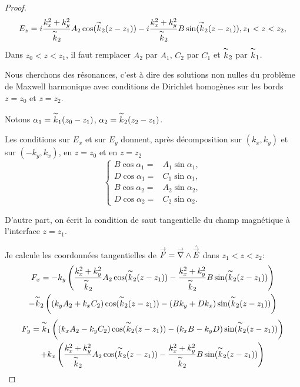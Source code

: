 \begin{proof}
    \[
    E_z=i\dfrac{k_x^2+k_y^2}{\overset{\thicksim}{k}_2}A_2\cos(\overset{\thicksim}{k}_2(z-z_1))-i\dfrac{k_x^2+k_y^2}{\overset{\thicksim}{k}_2}B\sin(\overset{\thicksim}{k}_2(z-z_1)), z_1<z<z_2,
    \]
    Dans \(z_0<z<z_1\), il faut remplacer \(A_2\) par \(A_1\), \(C_2\) par \(C_1\) et \(\overset{\thicksim}{k}_2\) par \(\overset{\thicksim}{k}_1\).

    Nous cherchons des résonances, c'est à dire des solutions non nulles du problème de Maxwell harmonique avec conditions de Dirichlet homogènes sur les bords \(z=z_0\) et \(z=z_2\).

    Notons \(\alpha_1=\overset{\thicksim}{k}_1(z_0-z_1)\), \(\alpha_2=\overset{\thicksim}{k}_2(z_2-z_1)\).

    Les conditions sur \(E_x\) et sur \(E_y\) donnent, après décomposition sur \((k_x,k_y)\) et sur \((-k_y,k_x)\), en \(z=z_0\) et en \(z=z_2\)
    \[
    \left\{
    \begin{aligned}
    B\cos \alpha_1={}& A_1\sin \alpha_1,
    \\
    D\cos \alpha_1={}& C_1\sin \alpha_1,
    \\
    B\cos \alpha_2={}& A_2\sin \alpha_2,
    \\
    D\cos \alpha_2={}& C_2\sin \alpha_2.
    \end{aligned}
    \right.
    \]

    D'autre part, on écrit la condition de saut tangentielle du champ magnétique à l'interface \(z=z_1\).

    Je calcule les coordonnées tangentielles de \({\overset{\rightarrow}{F}} = {\overset{\rightarrow}{\nabla}}\wedge \hat{{\overset{\rightarrow}{E}}}\) dans \(z_1<z<z_2\):
    \begin{multline*}
    F_x = -k_y\left(\dfrac{k_x^2+k_y^2}{\overset{\thicksim}{k}_2}A_2\cos(\overset{\thicksim}{k}_2(z-z_1))-\dfrac{k_x^2+k_y^2}{\overset{\thicksim}{k}_2}B\sin(\overset{\thicksim}{k}_2(z-z_1))\right)
    \\
    -\overset{\thicksim}{k}_2\left((k_yA_2+k_xC_2)\cos(\overset{\thicksim}{k}_2(z-z_1))-(Bk_y+Dk_x)\sin(\overset{\thicksim}{k}_2(z-z_1))\right)
    \end{multline*}
    \begin{multline*}
    F_y = \overset{\thicksim}{k}_1\left((k_xA_2-k_yC_2)\cos(\overset{\thicksim}{k}_2(z-z_1))-(k_xB-k_yD)\sin(\overset{\thicksim}{k}_2(z-z_1))\right)
    \\
    +k_x\left(\dfrac{k_x^2+k_y^2}{\overset{\thicksim}{k}_2}A_2\cos(\overset{\thicksim}{k}_2(z-z_1))-\dfrac{k_x^2+k_y^2}{\overset{\thicksim}{k}_2}B\sin(\overset{\thicksim}{k}_2(z-z_1))\right)
    \end{multline*}


\end{proof}
